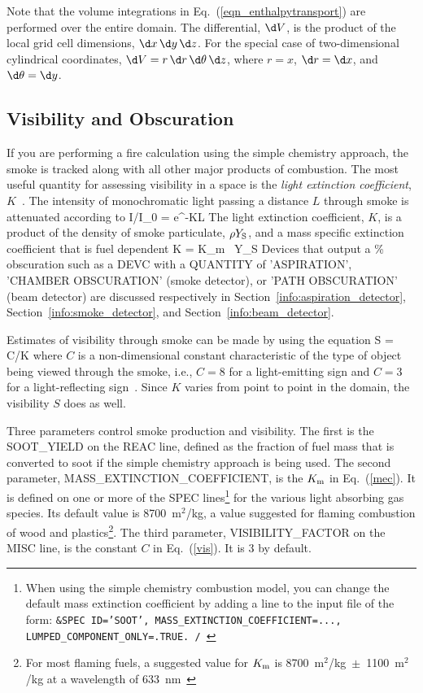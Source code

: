 \documentclass[11pt]{book}
\begin{document}
Note that the volume integrations in Eq.~(\ref{eqn_enthalpytransport}) are performed over the entire domain. The differential, $\d V$, is the product of the local grid cell dimensions, $\d x \, \d y \, \d z$. For the special case of two-dimensional cylindrical coordinates, $\d V=r \, \d r \, \d \theta \, \d z$, where $r=x$, $\d r = \d x$, and $\d \theta = \d y$.







\subsection{Visibility and Obscuration}
\label{info:visibility}
\label{info:obscuration}

If you are performing a fire calculation using the simple chemistry approach, the smoke is tracked along with all other major products of combustion. The most useful quantity for assessing visibility in a space is the {\em light extinction coefficient}, $K$~\cite{SFPE:Mulholland}. The intensity of monochromatic light passing a distance $L$ through smoke is attenuated according to \be I/I_0 = {\rm e}^{-KL} \ee The light extinction coefficient, $K$, is a product of the density of smoke particulate, $\rho Y_{\rm S}$, and a mass specific extinction coefficient that is fuel dependent \be K = K_{\rm m} \; \rho \, Y_{\rm S} \label{mec} \ee Devices that output a \% obscuration such as a {\ct DEVC} with a {\ct QUANTITY} of {\ct 'ASPIRATION'}, {\ct 'CHAMBER OBSCURATION'} (smoke detector), or {\ct 'PATH OBSCURATION'} (beam detector) are discussed respectively in Section~\ref{info:aspiration_detector}, Section~\ref{info:smoke_detector}, and Section~\ref{info:beam_detector}.

Estimates of visibility through smoke can be made by using the equation
\be  S = C/K  \label{vis}  \ee
where $C$ is a non-dimensional constant characteristic of the type of object being viewed through the smoke, i.e., $C=8$ for a light-emitting sign and $C=3$ for a light-reflecting sign~\cite{SFPE:Mulholland}. Since $K$ varies from point to point in the domain, the visibility $S$ does as well.

Three parameters control smoke production and visibility. The first is the {\ct SOOT\_YIELD} on the {\ct REAC} line, defined as the fraction of fuel mass that is converted to soot if the simple chemistry approach is being used. The second parameter, {\ct MASS\_EXTINCTION\_COEFFICIENT}, is the $K_{\rm m}$ in Eq.~(\ref{mec}). It is defined on one or more of the {\ct SPEC} lines\footnote{When using the simple chemistry combustion model, you can change the default mass extinction coefficient by adding a line to the input file of the form: \tt{\footnotesize \&SPEC ID='SOOT', MASS\_EXTINCTION\_COEFFICIENT=..., LUMPED\_COMPONENT\_ONLY=.TRUE. /} } for the various light absorbing gas species. Its default value is 8700~m$^2$/kg, a value suggested for flaming combustion of wood and plastics\footnote{For most flaming fuels, a suggested value for $K_{\rm m}$ is 8700~m$^2$/kg~$\pm$~1100~m$^2$/kg at a wavelength of 633~nm~\cite{Mulholland:F+M}}. The third parameter, {\ct VISIBILITY\_FACTOR} on the {\ct MISC} line, is the constant $C$ in Eq.~(\ref{vis}). It is 3 by default.
\end{document}
